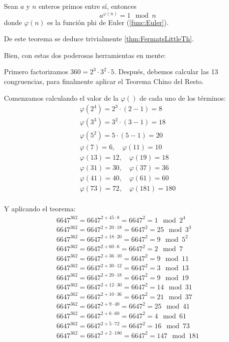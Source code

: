 \begin{problem} [9]
\begin{enumerate}
\begin{theorem}
Sean $a$ y $n$ enteros primos entre sí, entonces
\[ a^{\varphi(n)} = 1 \mod n \]
donde $\varphi(n)$ es la función phi de Euler (\ref{func:Euler}).
\label{thm:Euler}
\end{theorem}
\obs De este teorema se deduce trivialmente \ref{thm:FermatsLittleTh}.

Bien, con estas dos poderosas herramientas en mente:

Primero factorizamos $360 = 2^3 \cdot 3^2 \cdot 5$. Después, debemos calcular las 13 congruencias, para finalmente aplicar el Teorema Chino del Resto.

Comenzamos calculando el valor de la $\varphi()$ de cada uno de los términos:
\begin{gather*}
\varphi(2^4) = 2^3 \cdot(2-1) = 8\\
\varphi(3^3) = 3^2 \cdot (3-1) = 18\\
\varphi(5^2) = 5 \cdot (5 - 1) = 20\\
\varphi(7) = 6, \quad \varphi(11) = 10\\
\varphi(13) = 12, \quad \varphi(19) = 18\\
\varphi(31) = 30, \quad \varphi(37) = 36\\
\varphi(41) = 40, \quad \varphi(61) = 60\\
\varphi(73) = 72, \quad \varphi(181) = 180\\
\end{gather*}

Y aplicando el teorema:
\begin{gather*}
6647^{362} = 6647^{2 + 45 \cdot 8} = 6647^2 = 1 \mod 2^4\\
6647^{362} = 6647^{2 + 20 \cdot 18} = 6647^2 = 25 \mod 3^3\\
6647^{362} = 6647^{2 + 18 \cdot 20} = 6647^2 = 9 \mod 5^2\\
6647^{362} = 6647^{2 + 60 \cdot 6} = 6647^2 = 2 \mod 7\\
6647^{362} = 6647^{2 + 36 \cdot 10} = 6647^2 = 9 \mod 11\\
6647^{362} = 6647^{2 + 30 \cdot 12} = 6647^2 = 3 \mod 13\\
6647^{362} = 6647^{2 + 20 \cdot 18} = 6647^2 = 9 \mod 19\\
6647^{362} = 6647^{2 + 12 \cdot 30} = 6647^2 = 14 \mod 31\\
6647^{362} = 6647^{2 + 10 \cdot 36} = 6647^2 = 21 \mod 37\\
6647^{362} = 6647^{2 + 9 \cdot 40} = 6647^2 = 25 \mod 41\\
6647^{362} = 6647^{2 + 6 \cdot 60} = 6647^2 = 4 \mod 61\\
6647^{362} = 6647^{2 + 5 \cdot 72} = 6647^2 = 16 \mod 73\\
6647^{362} = 6647^{2 + 2 \cdot 180} = 6647^2 = 147 \mod 181\\
\end{gather*}


\end{enumerate}
\end{problem}
